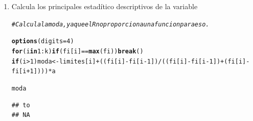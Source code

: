 \documentclass[12pt,letterpaper]{article}\usepackage[]{graphicx}\usepackage[]{color}
\makeatletter
\newcommand{\hlnum}[1]{\textcolor[rgb]{0.686,0.059,0.569}{#1}}%
\newcommand{\hlcom}[1]{\textcolor[rgb]{0.678,0.584,0.686}{\textit{#1}}}%
\newcommand{\hlopt}[1]{\textcolor[rgb]{0,0,0}{#1}}%
\newcommand{\hlstd}[1]{\textcolor[rgb]{0.345,0.345,0.345}{#1}}%
\newcommand{\hlkwa}[1]{\textcolor[rgb]{0.161,0.373,0.58}{\textbf{#1}}}%
\newcommand{\hlkwb}[1]{\textcolor[rgb]{0.69,0.353,0.396}{#1}}%
\newcommand{\hlkwc}[1]{\textcolor[rgb]{0.333,0.667,0.333}{#1}}%
\newcommand{\hlkwd}[1]{\textcolor[rgb]{0.737,0.353,0.396}{\textbf{#1}}}%
\newenvironment{kframe}{%
 \def\at@end@of@kframe{}%
 \ifinner\ifhmode%
  \def\at@end@of@kframe{\end{minipage}}%
  \begin{minipage}{\columnwidth}%
 \fi\fi%
 \def\FrameCommand##1{\hskip\@totalleftmargin \hskip-\fboxsep
 \colorbox{shadecolor}{##1}\hskip-\fboxsep
     \hskip-\linewidth \hskip-\@totalleftmargin \hskip\columnwidth}%
 \MakeFramed {\advance\hsize-\width
   \@totalleftmargin\z@ \linewidth\hsize
   \@setminipage}}%
 {\par\unskip\endMakeFramed%
 \at@end@of@kframe}
\newenvironment{knitrout}{}{} %
\makeatother
\begin{document}
\begin{enumerate}
\begin{knitrout}
\end{knitrout}

\item  Calcula los principales estad\'itico descriptivos de la variable
\begin{knitrout}
\color{fgcolor}\begin{kframe}
\begin{alltt}
\hlcom{# Calcula la moda, ya que el R no proporciona una funcion para eso.}

\hlkwd{options}\hlstd{(}\hlkwc{digits}\hlstd{=}\hlnum{4}\hlstd{)}
\hlkwa{for}\hlstd{(i} \hlkwa{in} \hlnum{1}\hlopt{:}\hlstd{k)} \hlkwa{if} \hlstd{(fi[i]} \hlopt{==} \hlkwd{max}\hlstd{(fi))} \hlkwa{break}\hlstd{()}
\hlkwa{if}\hlstd{(i} \hlopt{>} \hlnum{1}\hlstd{) moda} \hlkwb{<-} \hlstd{limites[i]}\hlopt{+}\hlstd{((fi[i]}\hlopt{-}\hlstd{fi[i}\hlopt{-}\hlnum{1}\hlstd{])}\hlopt{/}\hlstd{((fi[i]}\hlopt{-}\hlstd{fi[i}\hlopt{-}\hlnum{1}\hlstd{])}\hlopt{+}\hlstd{(fi[i]}\hlopt{-}\hlstd{fi[i}\hlopt{+}\hlnum{1}\hlstd{])))}\hlopt{*}\hlstd{a}

\hlstd{moda}
\end{alltt}
\begin{verbatim}
## to 
## NA
\end{verbatim}
\end{kframe}
\end{knitrout}


































\end{enumerate}
\end{document}

